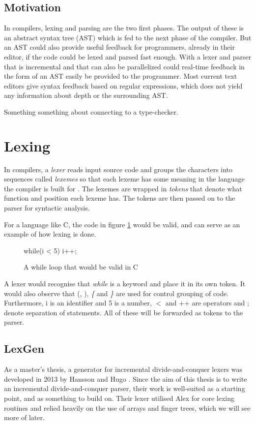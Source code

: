 \documentclass[a4paper,12pt,twosided]{report}
\begin{document}
\subsection{Motivation}
In compilers, lexing and parsing are the two first phases. The output of these
is an abstract syntax tree (AST) which is fed to the next phase of the compiler.
But an AST could also provide useful feedback for programmers, already in their
editor, if the code could be lexed and parsed fast enough. With a lexer and
parser that is incremental and that can also be parallelized could real-time
feedback in the form of an AST easily be provided to the programmer. Most
current text editors give syntax feedback based on regular expressions, which
does not yield any information about depth or the surrounding AST.

Something something about connecting to a type-checker.

\section{Lexing}
In compilers, a \textit{lexer} reads input source code and groups the characters
into sequences called \textit{lexemes} so that each lexeme has some meaning in
the language the compiler is built for \cite[p. 5, p. 109]{dragonbook}. The
lexemes are wrapped in \textit{tokens} that denote what function and position
each lexeme has. The tokens are then passed on to the parser for syntactic
analysis.

For a language like C, the code in figure \ref{lexsample} would be valid, and
can serve as an example of how lexing is done.
\begin{figure}[H]
\begin{code}
while(i < 5) {
    i++;
}
\end{code}
\caption{A while loop that would be valid in C}
\label{lexsample}
\end{figure}
A lexer would recognise that \textit{while} is a keyword and place it in its own
token. It would also observe that (, ), \textit{\{} and \textit{\}} are used for
control grouping of code. Furthermore, i is an identifier and 5 is a number, $<$
and ++ are operators and ; denote separation of statements. All of these will be
forwarded as tokens to the parser.

\subsection{LexGen}
As a master's thesis, a generator for incremental divide-and-conquer lexers was
developed in 2013 by Hansson and Hugo \cite{divconqlex}. Since the aim of this
thesis is to write an incremental divide-and-conquer parser, their work is
well-suited as a starting point, and as something to build on. Their lexer
utilised Alex for core lexing routines and relied heavily on the use of arrays
and finger trees, which we will see more of later. 
\end{document}
